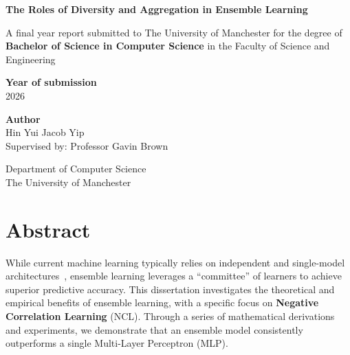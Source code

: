 \documentclass[draft]{article}
\begin{document}
\begin{titlepage}

    \begin{center}
        \vspace*{1cm}

        \huge
        \textbf{The Roles of Diversity and Aggregation in Ensemble Learning}

        \vspace{1.5cm}

        \large
        A final year report submitted to The University of Manchester for the degree of \textbf{Bachelor of Science in Computer Science} in the Faculty of Science and Engineering

        \vspace{1.5cm}

        \textbf{Year of submission}
        \\
        2026

        \vspace{2cm}

        \textbf{Author}
        \\
        \large Hin Yui Jacob Yip
        \\
        \large Supervised by: Professor Gavin Brown

        \vfill

        \large
        Department of Computer Science
        \\
        The University of Manchester

        \vspace{0.8cm}
        
    \end{center}
\end{titlepage}


\newpage
\tableofcontents
\newpage


\hypersetup{
    linkcolor=blue
}


\newpage
\section*{Abstract}
While current machine learning typically relies on independent and single-model architectures~\cite{zhao2023survey}, ensemble learning leverages a ``committee'' of learners to achieve superior predictive accuracy. This dissertation investigates the theoretical and empirical benefits of ensemble learning, with a specific focus on \textbf{Negative Correlation Learning} (NCL). Through a series of mathematical derivations and experiments, we demonstrate that an ensemble model consistently outperforms a single Multi-Layer Perceptron (MLP). 
\end{document}
